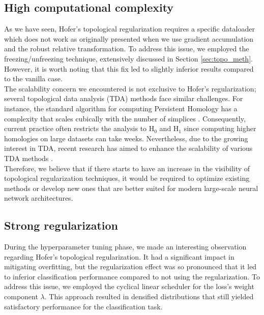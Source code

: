 \documentclass[../main.tex]{subfiles}
\begin{document}
\subsection{High computational complexity}
As we have seen, Hofer's topological regularization requires a specific dataloader which does not work as originally presented when we use gradient accumulation and the robust relative transformation. To address this issue, we employed the freezing/unfreezing technique, extensively discussed in Section \ref{sec:topo_meth}. However, it is worth noting that this fix led to slightly inferior results compared to the vanilla case.\\

The scalability concern we encountered is not exclusive to Hofer's regularization; several topological data analysis (TDA) methods face similar challenges. For instance, the standard algorithm for computing Persistent Homology has a complexity that scales cubically with the number of simplices \cite{akcora_reduction_2022}. Consequently, current practice often restricts the analysis to $\text{H}_0$ and $\text{H}_1$ since computing higher homologies on large datasets can take weeks. Nevertheless, due to the growing interest in TDA, recent research has aimed to enhance the scalability of various TDA methods \cite{akcora_reduction_2022, polianskii_breaking_2022}.\\

Therefore, we believe that if there starts to have an increase in the visibility of topological regularization techniques, it would be required to optimize existing methods or develop new ones that are better suited for modern large-scale neural network architectures.

\subsection{Strong regularization}

During the hyperparameter tuning phase, we made an interesting observation regarding Hofer's topological regularization. It had a significant impact in mitigating overfitting, but the regularization effect was so pronounced that it led to inferior classification performance compared to not using the regularization. To address this issue, we employed the cyclical linear scheduler for the loss's weight component $\lambda$. This approach resulted in densified distributions that still yielded satisfactory performance for the classification task.\\
\end{document}
